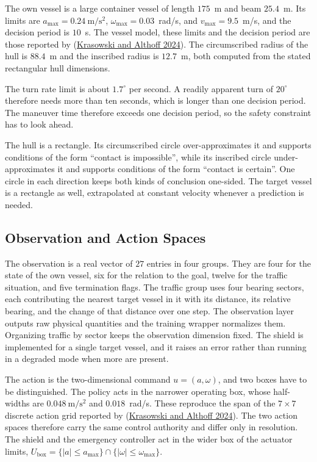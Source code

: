 \documentclass[10pt,letterpaper]{article}
\newcommand{\citl}[2]{(\hyperlink{ref:#1}{#2})}
\begin{document}
 The own vessel is a large container vessel of
length $175$~m and beam $25.4$~m. Its limits are $a_{\max}=0.24~\mathrm{m/s^2}$,
$\omega_{\max}=0.03$~rad/s, and $v_{\max}=9.5$~m/s, and the decision period is $10$~s.
The vessel model, these limits and the decision period are those reported by
\citl{krasowski2024}{Krasowski and Althoff 2024}. The circumscribed radius of the hull is $88.4$~m and the inscribed
radius is $12.7$~m, both computed from the stated rectangular hull dimensions.

The turn rate limit is about $1.7^\circ$ per second. A readily apparent turn of $20^\circ$
therefore needs more than ten seconds, which is longer than one decision period. The maneuver time therefore exceeds one decision period, so the safety constraint has to
look ahead.

The hull is a rectangle. Its circumscribed circle over-approximates it and supports
conditions of the form ``contact is impossible'', while its inscribed circle
under-approximates it and supports conditions of the form ``contact is certain''. One
circle in each direction keeps both kinds of conclusion one-sided. The target vessel is
a rectangle as well, extrapolated at constant velocity whenever a prediction is needed.

\subsection{Observation and Action Spaces}
\label{sec:obsact}

The observation is a real vector of $27$ entries in four groups. They are four for the
state of the own vessel, six for the relation to the goal, twelve for the traffic
situation, and five termination flags. The traffic group uses four bearing sectors, each contributing
the nearest target vessel in it with its distance, its relative bearing, and the change
of that distance over one step. The observation layer outputs raw physical quantities
and the training wrapper normalizes them. Organizing traffic by
sector keeps the observation dimension fixed. The shield is implemented for a single
target vessel, and it raises an error rather than running in a degraded mode when more
are present.

 The action is the two-dimensional command
$u=(a,\omega)$, and two boxes have to be distinguished. The policy acts in the narrower
operating box, whose half-widths are $0.048~\mathrm{m/s^2}$ and $0.018$~rad/s. These reproduce the span of the $7\times7$ discrete action grid reported by
\citl{krasowski2024}{Krasowski and Althoff 2024}. The two action spaces therefore carry
the same control authority and differ only in resolution. The shield
and the emergency controller act in the wider box of the actuator limits,
$U_{\mathrm{box}}=\{|a|\le a_{\max}\}\cap\{|\omega|\le\omega_{\max}\}$.
\end{document}
